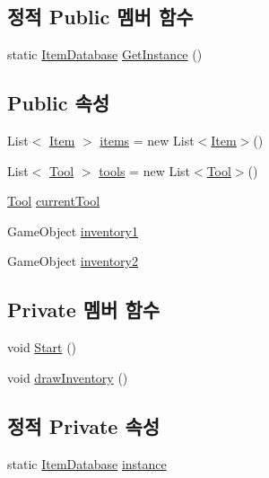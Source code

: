 \subsection*{정적 Public 멤버 함수}
\begin{DoxyCompactItemize}
\item 
static \mbox{\hyperlink{class_item_database}{Item\+Database}} \mbox{\hyperlink{class_item_database_a5312023347462b5af9c545c42934d26b}{Get\+Instance}} ()
\end{DoxyCompactItemize}
\subsection*{Public 속성}
\begin{DoxyCompactItemize}
\item 
List$<$ \mbox{\hyperlink{class_item}{Item}} $>$ \mbox{\hyperlink{class_item_database_aae8743202dc6def3345a1a6b400e70e4}{items}} = new List$<$\mbox{\hyperlink{class_item}{Item}}$>$()
\item 
List$<$ \mbox{\hyperlink{class_tool}{Tool}} $>$ \mbox{\hyperlink{class_item_database_a7cf2df2f86c863834ff3379c46748fb8}{tools}} = new List$<$\mbox{\hyperlink{class_tool}{Tool}}$>$()
\item 
\mbox{\hyperlink{class_tool}{Tool}} \mbox{\hyperlink{class_item_database_ae47115d7b28e0c2f0dec2b1fba016ce1}{current\+Tool}}
\item 
Game\+Object \mbox{\hyperlink{class_item_database_a12b041c3f602e7bb9b176de5d29237d5}{inventory1}}
\item 
Game\+Object \mbox{\hyperlink{class_item_database_a1cffd11f7e1826753626508420992544}{inventory2}}
\end{DoxyCompactItemize}
\subsection*{Private 멤버 함수}
\begin{DoxyCompactItemize}
\item 
void \mbox{\hyperlink{class_item_database_a0891a7bd4b3213485d52e7b0fcbde30b}{Start}} ()
\item 
void \mbox{\hyperlink{class_item_database_a587c4dbaea6399d804f3bb0d0ca377df}{draw\+Inventory}} ()
\end{DoxyCompactItemize}
\subsection*{정적 Private 속성}
\begin{DoxyCompactItemize}
\item 
static \mbox{\hyperlink{class_item_database}{Item\+Database}} \mbox{\hyperlink{class_item_database_ae47c35933c266fb0ef04d3dfaf880b1c}{instance}}
\end{DoxyCompactItemize}


